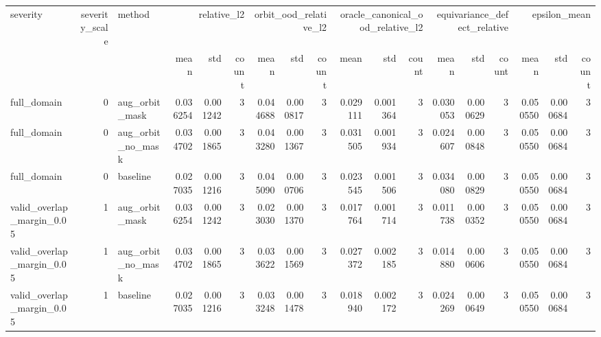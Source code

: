 \begin{tabular}{lrlrrrrrrrrrrrrrrr}
\toprule
severity & severity_scale & method & \multicolumn{3}{r}{relative_l2} & \multicolumn{3}{r}{orbit_ood_relative_l2} & \multicolumn{3}{r}{oracle_canonical_ood_relative_l2} & \multicolumn{3}{r}{equivariance_defect_relative} & \multicolumn{3}{r}{epsilon_mean} \\
 &  &  & mean & std & count & mean & std & count & mean & std & count & mean & std & count & mean & std & count \\
\midrule
full_domain & 0 & aug_orbit_mask & 0.036254 & 0.001242 & 3 & 0.044688 & 0.000817 & 3 & 0.029111 & 0.001364 & 3 & 0.030053 & 0.000629 & 3 & 0.050550 & 0.000684 & 3 \\
full_domain & 0 & aug_orbit_no_mask & 0.034702 & 0.001865 & 3 & 0.043280 & 0.001367 & 3 & 0.031505 & 0.001934 & 3 & 0.024607 & 0.000848 & 3 & 0.050550 & 0.000684 & 3 \\
full_domain & 0 & baseline & 0.027035 & 0.001216 & 3 & 0.045090 & 0.000706 & 3 & 0.023545 & 0.001506 & 3 & 0.034080 & 0.000829 & 3 & 0.050550 & 0.000684 & 3 \\
valid_overlap_margin_0.05 & 1 & aug_orbit_mask & 0.036254 & 0.001242 & 3 & 0.023030 & 0.001370 & 3 & 0.017764 & 0.001714 & 3 & 0.011738 & 0.000352 & 3 & 0.050550 & 0.000684 & 3 \\
valid_overlap_margin_0.05 & 1 & aug_orbit_no_mask & 0.034702 & 0.001865 & 3 & 0.033622 & 0.001569 & 3 & 0.027372 & 0.002185 & 3 & 0.014880 & 0.000606 & 3 & 0.050550 & 0.000684 & 3 \\
valid_overlap_margin_0.05 & 1 & baseline & 0.027035 & 0.001216 & 3 & 0.033248 & 0.001478 & 3 & 0.018940 & 0.002172 & 3 & 0.024269 & 0.000649 & 3 & 0.050550 & 0.000684 & 3 \\
\bottomrule
\end{tabular}
